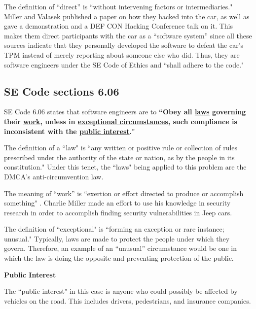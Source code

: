 \documentclass[12pt]{article}
\begin{document}
\begin{multicols}{2}
The definition of ``direct'' is ``without intervening factors or intermediaries."\cite{dictionary} Miller and Valasek published a paper on how they hacked into the car\cite{officialPaper}, as well as gave a demonstration\cite{wired} and a DEF CON Hacking Conference talk on it\cite{youtube}. 
This makes them direct participants with the car as a ``software system'' since all these sources indicate that they personally developed the software to defeat the car's TPM instead of merely reporting about someone else who did. Thus, they are software engineers under the SE Code of Ethics and ``shall adhere to the code."\cite{seCode}


\subsection{SE Code sections 6.06}
SE Code 6.06 states that software engineers are to \textbf{``Obey all \underline{laws} governing their \underline{work}, unless in \underline{exceptional circumstances}, such compliance is inconsistent with the \underline{public interest}."} \cite{seCode}

The definition of a ``law" is ``any written or positive rule or collection of rules prescribed under the authority of the state or nation, as by the people in its constitution."\cite{dictionary} Under this tenet, the ``laws" being applied to this problem are the DMCA's anti-circumvention law. 

The meaning of ``work'' is ``exertion or effort directed to produce or accomplish something" \cite{dictionary}. Charlie Miller made an effort to use his knowledge in security research in order to accomplish finding security vulnerabilities in Jeep cars.

The definition of ``exceptional" is ``forming an exception or rare instance; unusual." \cite{dictionary} Typically, laws are made to protect the people under which they govern. Therefore, an example of an ``unusual'' circumstance would be one in which the law is doing the opposite and preventing protection of the public.

\vspace{.5cm}\hspace{-.5cm}\textbf{Public Interest}\vspace{.2cm}

The ``public interest" in this case is anyone who could possibly be affected by vehicles on the road. This includes drivers, pedestrians, and insurance companies.


\end{multicols}
\end{document}
